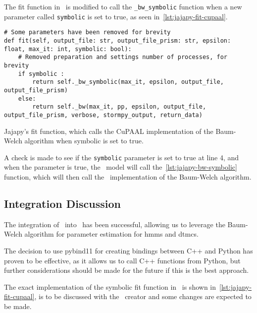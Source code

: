 The fit function in \Jajapy\ is modified to call the \texttt{\_bw\_symbolic} function when a new parameter called \texttt{symbolic} is set to true, as seen in~\autoref{lst:jajapy-fit-cupaal}.


\begin{listing}[htb!]
    \begin{verbatim}
# Some parameters have been removed for brevity
def fit(self, output_file: str, output_file_prism: str, epsilon: float, max_it: int, symbolic: bool):
    # Removed preparation and settings number of processes, for brevity
    if symbolic :
        return self._bw_symbolic(max_it, epsilon, output_file, output_file_prism)
    else:
        return self._bw(max_it, pp, epsilon, output_file, output_file_prism, verbose, stormpy_output, return_data)
      \end{verbatim}
    \caption{Jajapy's fit function, which calls the CuPAAL implementation of the Baum-Welch algorithm when symbolic is set to true.}
    \label{lst:jajapy-fit-cupaal}
\end{listing}

A check is made to see if the \texttt{symbolic} parameter is set to true at line 4, and when the parameter is true, the \Jajapy\ model will call the~\autoref{lst:jajapy-bw-symbolic} function, which will then call the \Cupaal\ implementation of the Baum-Welch algorithm.

\subsection{Integration Discussion}\label{subsec:integration-discussion}
The integration of \Cupaal\ into \Jajapy\ has been successful, allowing us to leverage the Baum-Welch algorithm for parameter estimation for \glspl{hmm} and \glspl{dtmc}.

The decision to use pybind11 for creating bindings between C++ and Python has proven to be effective, as it allows us to call C++ functions from Python, but further considerations should be made for the future if this is the best approach.

The exact implementation of the symbolic fit function in \Jajapy\ is shown in~\autoref{lst:jajapy-fit-cupaal}, is to be discussed with the \Jajapy\ creator and some changes are expected to be made.

